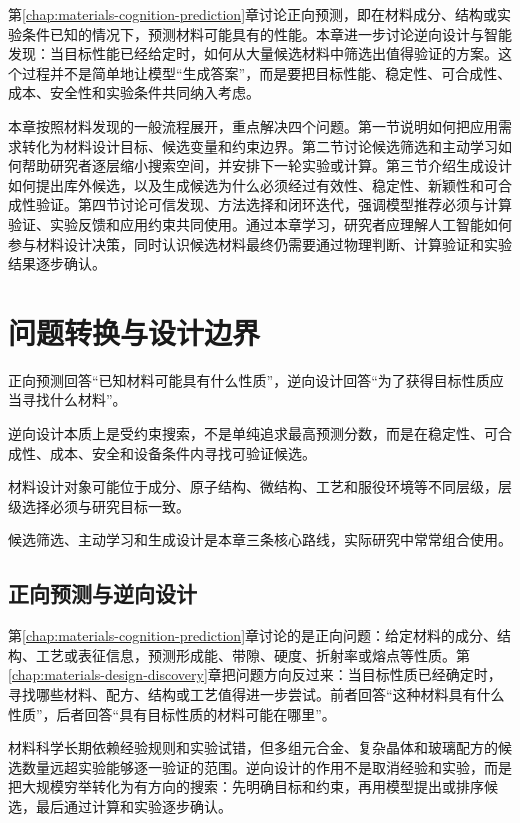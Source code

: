 第\ref{chap:materials-cognition-prediction}章讨论正向预测，即在材料成分、结构或实验条件已知的情况下，预测材料可能具有的性能。本章进一步讨论逆向设计与智能发现：当目标性能已经给定时，如何从大量候选材料中筛选出值得验证的方案。这个过程并不是简单地让模型“生成答案”，而是要把目标性能、稳定性、可合成性、成本、安全性和实验条件共同纳入考虑。

本章按照材料发现的一般流程展开，重点解决四个问题。第一节说明如何把应用需求转化为材料设计目标、候选变量和约束边界。第二节讨论候选筛选和主动学习如何帮助研究者逐层缩小搜索空间，并安排下一轮实验或计算。第三节介绍生成设计如何提出库外候选，以及生成候选为什么必须经过有效性、稳定性、新颖性和可合成性验证。第四节讨论可信发现、方法选择和闭环迭代，强调模型推荐必须与计算验证、实验反馈和应用约束共同使用。通过本章学习，研究者应理解人工智能如何参与材料设计决策，同时认识候选材料最终仍需要通过物理判断、计算验证和实验结果逐步确认。




\clearpage
\section{问题转换与设计边界}


\begin{sectionkeypoints}
\item 正向预测回答“已知材料可能具有什么性质”，逆向设计回答“为了获得目标性质应当寻找什么材料”。
\item 逆向设计本质上是受约束搜索，不是单纯追求最高预测分数，而是在稳定性、可合成性、成本、安全和设备条件内寻找可验证候选。
\item 材料设计对象可能位于成分、原子结构、微结构、工艺和服役环境等不同层级，层级选择必须与研究目标一致。
\item 候选筛选、主动学习和生成设计是本章三条核心路线，实际研究中常常组合使用。
\end{sectionkeypoints}

\subsection{正向预测与逆向设计}

第\ref{chap:materials-cognition-prediction}章讨论的是正向问题：给定材料的成分、结构、工艺或表征信息，预测形成能、带隙、硬度、折射率或熔点等性质。第\ref{chap:materials-design-discovery}章把问题方向反过来：当目标性质已经确定时，寻找哪些材料、配方、结构或工艺值得进一步尝试。前者回答“这种材料具有什么性质”，后者回答“具有目标性质的材料可能在哪里”。


材料科学长期依赖经验规则和实验试错，但多组元合金、复杂晶体和玻璃配方的候选数量远超实验能够逐一验证的范围。逆向设计的作用不是取消经验和实验，而是把大规模穷举转化为有方向的搜索：先明确目标和约束，再用模型提出或排序候选，最后通过计算和实验逐步确认。


